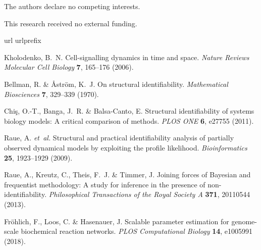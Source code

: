 \documentclass[pdflatex,sn-nature]{sn-jnl}
\begin{document}
The authors declare no competing interests.


This research received no external funding.


\begin{thebibliography}{10}
\expandafter\ifx\csname url\endcsname\relax
  \def\url#1{\burl{#1}}\fi
\expandafter\ifx\csname urlprefix\endcsname\relax\def\urlprefix{URL }\fi
\providecommand{\bibinfo}[2]{#2}
\providecommand{\eprint}[2][]{\url{#2}}
\providecommand{\doi}[1]{\url{https://doi.org/#1}}
\bibcommenthead

\bibinfo{author}{Kholodenko, B.~N.}
\newblock \bibinfo{title}{Cell-signalling dynamics in time and space}.
\newblock \emph{\bibinfo{journal}{Nature Reviews Molecular Cell Biology}}
  \textbf{\bibinfo{volume}{7}}, \bibinfo{pages}{165--176}
  (\bibinfo{year}{2006}).

\bibinfo{author}{Bellman, R.} \& \bibinfo{author}{{\AA}str{\"o}m, K.~J.}
\newblock \bibinfo{title}{On structural identifiability}.
\newblock \emph{\bibinfo{journal}{Mathematical Biosciences}}
  \textbf{\bibinfo{volume}{7}}, \bibinfo{pages}{329--339}
  (\bibinfo{year}{1970}).

\bibinfo{author}{Chi{\c{s}}, O.-T.}, \bibinfo{author}{Banga, J.~R.} \&
  \bibinfo{author}{Balsa-Canto, E.}
\newblock \bibinfo{title}{Structural identifiability of systems biology models:
  A critical comparison of methods}.
\newblock \emph{\bibinfo{journal}{PLOS ONE}} \textbf{\bibinfo{volume}{6}},
  \bibinfo{pages}{e27755} (\bibinfo{year}{2011}).

\bibinfo{author}{Raue, A.} \emph{et~al.}
\newblock \bibinfo{title}{Structural and practical identifiability analysis of
  partially observed dynamical models by exploiting the profile likelihood}.
\newblock \emph{\bibinfo{journal}{Bioinformatics}}
  \textbf{\bibinfo{volume}{25}}, \bibinfo{pages}{1923--1929}
  (\bibinfo{year}{2009}).

\bibinfo{author}{Raue, A.}, \bibinfo{author}{Kreutz, C.},
  \bibinfo{author}{Theis, F.~J.} \& \bibinfo{author}{Timmer, J.}
\newblock \bibinfo{title}{Joining forces of {Bayesian} and frequentist
  methodology: A study for inference in the presence of non-identifiability}.
\newblock \emph{\bibinfo{journal}{Philosophical Transactions of the Royal
  Society A}} \textbf{\bibinfo{volume}{371}}, \bibinfo{pages}{20110544}
  (\bibinfo{year}{2013}).

\bibinfo{author}{Fr{\"o}hlich, F.}, \bibinfo{author}{Loos, C.} \&
  \bibinfo{author}{Hasenauer, J.}
\newblock \bibinfo{title}{Scalable parameter estimation for genome-scale
  biochemical reaction networks}.
\newblock \emph{\bibinfo{journal}{PLOS Computational Biology}}
  \textbf{\bibinfo{volume}{14}}, \bibinfo{pages}{e1005991}
  (\bibinfo{year}{2018}).


\end{thebibliography}
\end{document}
